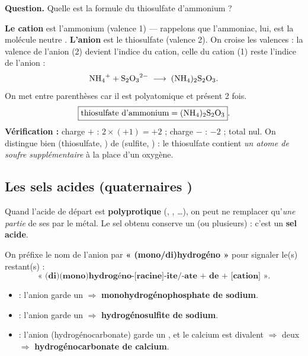 \documentclass[11pt,a4paper]{article}
\begin{document}
\begin{exemple}
\textbf{Question.} Quelle est la formule du thiosulfate d'ammonium ?

\smallskip
\textbf{Le cation} est l'ammonium  (valence 1) — rappelons que l'ammoniac, lui, est la molécule
neutre . \textbf{L'anion} est le thiosulfate  (valence 2). On croise les valences :
la valence de l'anion (2) devient l'indice du cation, celle du cation (1) reste l'indice de l'anion :
\[ \ce{NH4+} + \ce{S2O3^2-} \;\longrightarrow\; \ce{(NH4)2S2O3}. \]
On met  entre parenthèses car il est polyatomique et présent 2 fois.
\[ \boxed{\text{thiosulfate d'ammonium} = \ce{(NH4)2S2O3}}. \]
\textbf{Vérification :} charge $+$ : $2\times(+1)=+2$ ; charge $-$ : $-2$ ; total nul. On distingue bien
 (thiosulfate, ) de  (sulfite, ) : le thiosulfate
contient \emph{un atome de soufre supplémentaire} à la place d'un oxygène.
\end{exemple}

\subsection{Les sels acides (quaternaires )}

Quand l'acide de départ est \textbf{polyprotique} (, , \ldots), on peut ne
remplacer qu'\emph{une partie} de ses  par le métal. Le sel obtenu conserve un (ou plusieurs)  :
c'est un \textbf{sel acide}.

\begin{regle}
On préfixe le nom de l'anion par \textbf{« (mono/di)hydrogéno »} pour signaler le(s)  restant(s) :
\[ \textbf{« (di)(mono)hydrogéno-[racine]-ite/-ate + de + [cation] »}. \]
\end{regle}

\begin{exemple}
\begin{itemize}[leftmargin=1.6em,topsep=2pt,itemsep=2pt]
  \item {} : l'anion  garde un  $\Rightarrow$
        \textbf{monohydrogénophosphate de sodium}.
  \item {} : l'anion  garde un  $\Rightarrow$ \textbf{hydrogénosulfite de sodium}.
  \item {} : l'anion  (hydrogénocarbonate) garde un , et le calcium est divalent
        $\Rightarrow$ deux  $\Rightarrow$ \textbf{hydrogénocarbonate de calcium}.
\end{itemize}
\end{exemple}
\end{document}
